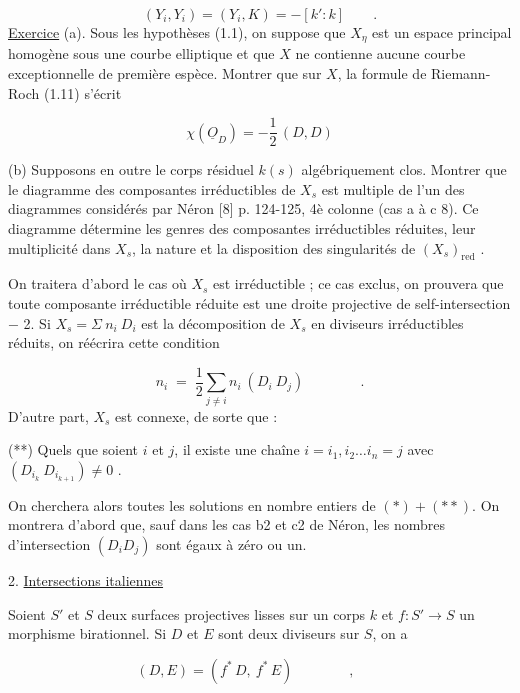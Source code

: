 \begin{equation*}
(Y_i,Y_i) = (Y_i,K) = -[k':k] \qquad .
\end{equation*}
\underline{Exercice} (a). Sous les hypothèses (1.1), on suppose que $X_\eta$ est un espace principal homogène sous une courbe elliptique et que $X$ ne contienne aucune courbe exceptionnelle de première espèce. Montrer que sur $X$, la formule de Riemann-Roch (1.11) s'écrit

\begin{equation*}
\chi(\underline{O}_D) = - \frac{1}{2} \, (D,D)
\end{equation*}


(b) Supposons en outre le corps résiduel $k(s)$ algébriquement clos. Montrer que le diagramme des composantes irréductibles de $X_s$ est multiple de l'un des diagrammes considérés par Néron [8] p. 124-125, 4è colonne (cas a à c 8). Ce diagramme détermine les genres des composantes irréductibles réduites, leur multiplicité dans $X_s$, la nature et la disposition des singularités de $(X_s)_{\mathrm{red}}$ .

On traitera d'abord le cas où $X_s$ est irréductible ; ce cas exclus, on prouvera que toute composante irréductible réduite est une droite projective de self-intersection $-$ 2. Si $X_s = \Sigma\ n_i\ D_i$ est la décomposition de $X_s$ en diviseurs irréductibles réduits, on réécrira cette condition

\begin{equation}\tag{*}
n_i \;=\; \frac{1}{2} \sum_{j \neq i} n_i \ (D_i \ D_j) \qquad\qquad .
\end{equation}
D'autre part, $X_s$ est connexe, de sorte que :

(**) Quels que soient $i$ et $j$, il existe une chaîne $i = i_1, i_2 \ldots i_n = j$ avec $(D_{i_k} \ D_{i_{k+1}}) \neq 0$ .

On cherchera alors toutes les solutions en nombre entiers de $(*) + (**)$. On montrera d'abord que, sauf dans les cas b2 et c2 de Néron, les nombres d'intersection $(D_i D_j)$ sont égaux à zéro ou un.


2. \underline{Intersections italiennes}

Soient $S'$ et $S$ deux surfaces projectives lisses sur un corps $k$ et $f : S' \longrightarrow S$ un morphisme birationnel. Si $D$ et $E$ sont deux diviseurs sur $S$, on a

\begin{equation*}
(D,E) = (f^* \, D, \ f^* \, E) \qquad\qquad , \qquad 
\end{equation*}

